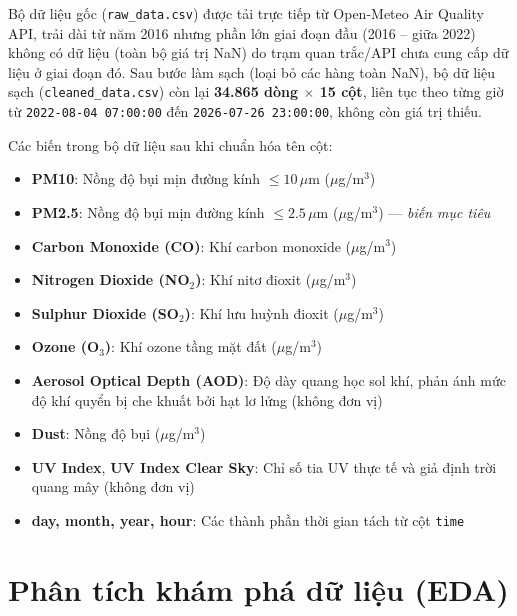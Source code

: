 \documentclass[12pt,oneside]{report}
\begin{document}
Bộ dữ liệu gốc (\texttt{raw\_data.csv}) được tải trực tiếp từ Open-Meteo Air Quality API, trải dài từ năm 2016 nhưng phần lớn giai đoạn đầu (2016 -- giữa 2022) không có dữ liệu (toàn bộ giá trị NaN) do trạm quan trắc/API chưa cung cấp dữ liệu ở giai đoạn đó. Sau bước làm sạch (loại bỏ các hàng toàn NaN), bộ dữ liệu sạch (\texttt{cleaned\_data.csv}) còn lại \textbf{34.865 dòng $\times$ 15 cột}, liên tục theo từng giờ từ \texttt{2022-08-04 07:00:00} đến \texttt{2026-07-26 23:00:00}, không còn giá trị thiếu.

Các biến trong bộ dữ liệu sau khi chuẩn hóa tên cột:

\begin{itemize}
    \item \textbf{PM10}: Nồng độ bụi mịn đường kính $\leq 10\,\mu$m ($\mu$g/m$^3$)
    \item \textbf{PM2.5}: Nồng độ bụi mịn đường kính $\leq 2.5\,\mu$m ($\mu$g/m$^3$) — \textit{biến mục tiêu}
    \item \textbf{Carbon Monoxide (CO)}: Khí carbon monoxide ($\mu$g/m$^3$)
    \item \textbf{Nitrogen Dioxide (NO$_2$)}: Khí nitơ đioxit ($\mu$g/m$^3$)
    \item \textbf{Sulphur Dioxide (SO$_2$)}: Khí lưu huỳnh đioxit ($\mu$g/m$^3$)
    \item \textbf{Ozone (O$_3$)}: Khí ozone tầng mặt đất ($\mu$g/m$^3$)
    \item \textbf{Aerosol Optical Depth (AOD)}: Độ dày quang học sol khí, phản ánh mức độ khí quyển bị che khuất bởi hạt lơ lửng (không đơn vị)
    \item \textbf{Dust}: Nồng độ bụi ($\mu$g/m$^3$)
    \item \textbf{UV Index}, \textbf{UV Index Clear Sky}: Chỉ số tia UV thực tế và giả định trời quang mây (không đơn vị)
    \item \textbf{day, month, year, hour}: Các thành phần thời gian tách từ cột \texttt{time}
\end{itemize}

\section{Phân tích khám phá dữ liệu (EDA)}
\end{document}
